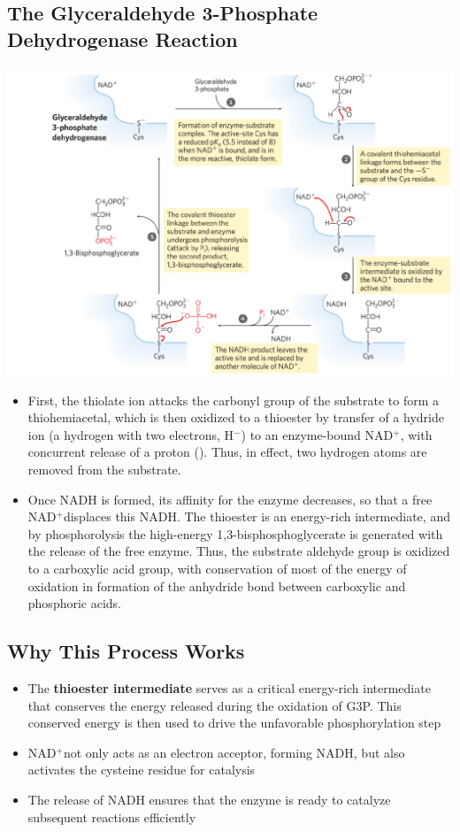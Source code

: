 \documentclass[10pt]{article}
\newcommand{\proton}{\text{H$^+$}}
\newcommand{\pc}{$^+$}
\newcommand{\nc}{$^-$}
\begin{document}
\subsection*{The Glyceraldehyde 3-Phosphate Dehydrogenase Reaction}
\begin{center} 
	\includegraphics*[width=\textwidth]{L1_13.png}
\end{center}
\begin{itemize}
	\item First, the thiolate ion attacks the carbonyl group of the substrate to form a thiohemiacetal, which is then oxidized to a thioester by transfer of a hydride ion (a hydrogen with two electrons, H\nc) to an enzyme-bound NAD\pc, with concurrent release of a proton (\proton).  Thus, in effect, two hydrogen atoms are removed from the substrate.
	\item Once NADH is formed, its affinity for the enzyme decreases, so that a free NAD\pc displaces this NADH.  The thioester is an energy-rich intermediate, and by phosphorolysis the high-energy 1,3-bisphosphoglycerate is generated with the release of the free enzyme.  Thus, the substrate aldehyde group is oxidized to a carboxylic acid group, with conservation of most of the energy of oxidation in formation of the anhydride bond between carboxylic and phosphoric acids.
\end{itemize}

\subsection*{Why This Process Works}
\begin{itemize}
	\item The \textbf{thioester intermediate} serves as a critical energy-rich intermediate that conserves the energy released during the oxidation of G3P.  This conserved energy is then used to drive the unfavorable phosphorylation step
	\item NAD\pc not only acts as an electron acceptor, forming NADH, but also activates the cysteine residue for catalysis
	\item The release of NADH ensures that the enzyme is ready to catalyze subsequent reactions efficiently
\end{itemize}
\end{document}
